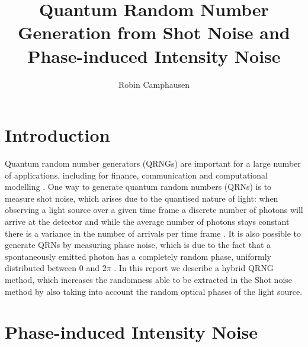 \documentclass[]{article}
\title{Quantum Random Number Generation from Shot Noise and Phase-induced Intensity Noise}
\author{Robin Camphausen}
\date{}
\begin{document}
\maketitle
\section{Introduction}

	Quantum random number generators (QRNGs) are important for a large number of applications, including for finance, communication and computational modelling \cite{herrero-collantes_quantum_2017}. One way to generate quantum random numbers (QRNs) is to measure shot noise, which arises due to the quantised nature of light: when observing a light source over a given time frame a discrete number of photons will arrive at the detector and while the average number of photons stays constant there is a variance in the number of arrivals per time frame \cite{sanguinetti_quantum_2014}. It is also possible to generate QRNs by measuring phase noise, which is due to the fact that a spontaneously emitted photon has a completely random phase, uniformly distributed between $0$ and $2\pi$ \cite{xu_ultrafast_2012,abellan_ultra-fast_2014}. In this report we describe a hybrid QRNG method, which increases the randomness able to be extracted in the Shot noise method by also taking into account the random optical phases of the light source.

\section{Phase-induced Intensity Noise} \label{RPS}
\end{document}
